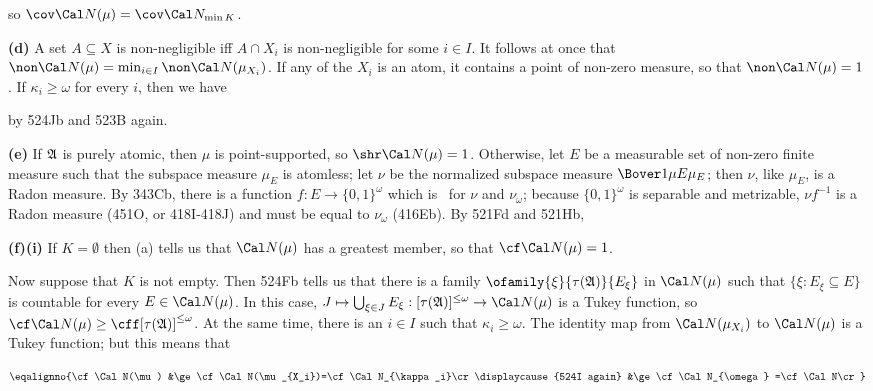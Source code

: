 {

\noindent so $\cov\Cal N(\mu)=\cov\Cal N_{\min K}$.

\medskip

{\bf (d)} A set $A\subseteq X$ is non-negligible iff $A\cap X_i$ is
non-negligible for some $i\in I$.   It follows at once that
$\non\Cal N(\mu)=\min_{i\in I}\non\Cal N(\mu_{X_i})$.
If any of the $X_i$ is an atom, it contains a point of non-zero measure,
so that $\non\Cal N(\mu)=1$.   If $\kappa_i\ge\omega$ for every $i$,
then we have


\noindent by 524Jb and 523B again.

\medskip

{\bf (e)} If $\frak A$ is purely atomic, then $\mu$ is point-supported, so
$\shr\Cal N(\mu)=1$.   Otherwise,
let $E$ be a measurable set of non-zero finite measure such that the
subspace measure $\mu_E$ is atomless;  let $\nu$ be the normalized subspace
measure $\Bover1{\mu E}\mu_E$;  then $\nu$, like $\mu_E$, is a Radon
measure.   By 343Cb, there is a
function $f:E\to\{0,1\}^{\omega}$ which
is \imp\ for $\nu$ and $\nu_{\omega}$;   because $\{0,1\}^{\omega}$ is
separable and metrizable, $\nu f^{-1}$ is a Radon measure
(451O, or
418I-418J) and must be equal to $\nu_{\omega}$ (416Eb).   By 521Fd and
521Hb,


\medskip

{\bf (f)(i)} If $K=\emptyset$ then (a) tells us that $\Cal N(\mu)$ has a
greatest member, so that $\cf\Cal N(\mu)=1$.

\medskip

 Now suppose that $K$ is not empty.   Then 524Fb tells us
that there is a family
$\ofamily{\xi}{\tau(\frak A)}{E_{\xi}}$ in $\Cal N(\mu)$ such that
$\{\xi:E_{\xi}\subseteq E\}$ is countable for every $E\in\Cal N(\mu)$.
In this case, $J\mapsto\bigcup_{\xi\in J}E_{\xi}:
   [\tau(\frak A)]^{\le\omega}\to\Cal N(\mu)$ is a Tukey function,
so $\cf\Cal N(\mu)\ge\cff[\tau(\frak A)]^{\le\omega}$.
At the same time, there is an $i\in I$ such that $\kappa_i\ge\omega$.
The identity map from $\Cal N(\mu_{X_i})$
to $\Cal N(\mu)$ is a Tukey function;  but this means that

$$\eqalignno{\cf\Cal N(\mu)
&\ge\cf\Cal N(\mu_{X_i})=\cf\Cal N_{\kappa_i}\cr
\displaycause{524I again}
&\ge\cf\Cal N_{\omega}
=\cf\Cal N\cr}$$

}
